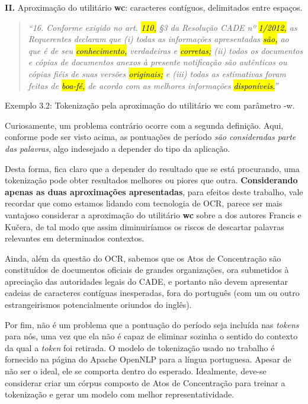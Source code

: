 \documentclass[11pt]{report}
\newcommand{\quotes}[1]{``#1''}
\begin{document}
\textbf{II.} Aproximação do utilitário \textbf{wc}: caracteres contíguos, delimitados entre espaços.

\begin{quote}
  \textit{\quotes{16. Conforme exigido no art. \hl{110,} §3 da Resolução CADE nº \hl{1/2012,} as Requerentes declaram que (i) todas as informações apresentadas \hl{\mbox{são,}} ao que é de seu
  \hl{conhecimento,} verdadeiras e \hl{corretas;} (ii) todos os documentos e cópias de documentos anexos à presente notificação são autênticos ou cópias fiéis de suas versões \hl{originais;}
  e (iii) todas as estimativas foram feitas de \hl{\mbox{boa-fé,}} de acordo com as melhores informações \hl{\mbox{disponíveis.}}}}
\end{quote}
\begin{center}
  Exemplo 3.2: Tokenização pela aproximação do utilitário wc com parâmetro -w.
\end{center}

Curiosamente, um problema contrário ocorre com a segunda definição. Aqui, conforme pode ser visto acima, as pontuações de período \textit{são consideradas parte das palavras}, algo
indesejado a depender do tipo da aplicação.

Desta forma, fica claro que a depender do resultado que se está procurando, uma tokenização pode obter resultados melhores ou piores que outra.
\textbf{Considerando apenas as duas aproximações apresentadas}, para efeitos deste trabalho,
vale recordar que como estamos lidando com tecnologia de OCR, parece ser mais vantajoso considerar a aproximação do utilitário \textbf{wc} sobre a dos autores
Francis e Kučera, de tal modo que assim diminuiríamos os riscos de descartar palavras relevantes em determinados contextos.

Ainda, além da questão do OCR, sabemos que os Atos de Concentração são constituídos de documentos oficiais de grandes organizações, ora submetidos à apreciação das
autoridades legais do CADE, e portanto não devem apresentar cadeias de caracteres contíguas inesperadas, fora do português (com um ou outro estrangeirismos
potencialmente oriundos do inglês).

Por fim, não é um problema que a pontuação do período seja incluída nas \textit{tokens} para nós, uma vez que ela não é capaz de eliminar sozinha o sentido do contexto da qual
a \textit{token} foi retirada. O modelo de tokenização usado no trabalho é fornecido na página do Apache OpenNLP para a língua portuguesa. Apesar de não ser o ideal, ele se comporta
dentro do esperado. Idealmente, deve-se considerar criar um córpus composto de Atos de Concentração para treinar a tokenização e gerar um modelo com melhor representatividade.
\end{document}
